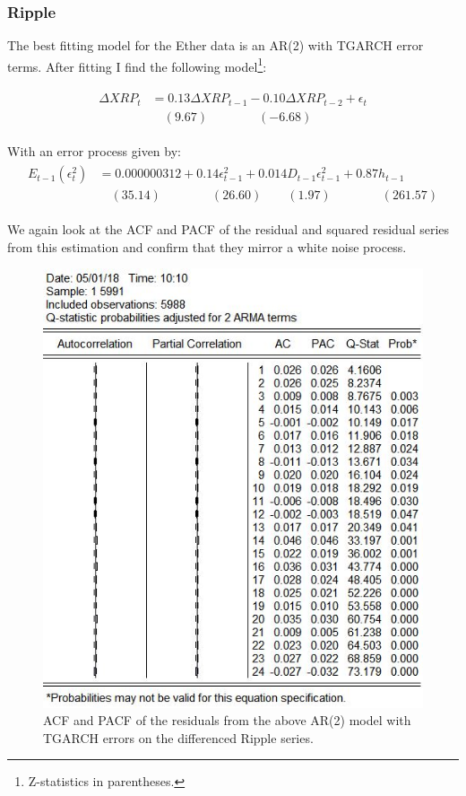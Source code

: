 \documentclass{article}
\begin{document}
	\subsubsection{Ripple}
	
	The best fitting model for the Ether data is an AR(2) with TGARCH error terms. After fitting I find the following model\footnote{Z-statistics in parentheses.}: 
	
	\begin{align}
	\begin{split}
	\Delta XRP_t &= 0.13 \Delta XRP_{t-1} - 0.10 \Delta XRP_{t-2} + \epsilon_t\\
	& \quad (9.67) \quad \quad \quad \quad (-6.68) 
	\end{split}
	\end{align}
	
	With an error process given by: 
	\begin{align}
	\begin{split}
	E_{t-1}(\epsilon_t^2)  &= 0.000000312 + 0.14 \epsilon^2_{t-1} + 0.014 D_{t-1} \epsilon^2_{t-1} + 0.87 h_{t-1}\\
	& \quad (35.14) \quad \quad \quad \quad (26.60) \quad \quad (1.97) \quad \quad \quad \quad (261.57)
	\end{split}
	\end{align}
	
	We again look at the ACF and PACF of the residual and squared residual series from this estimation and confirm that they mirror a white noise process. 
	
	\begin{figure}[H]
		\centering
		\includegraphics[width = .75\textwidth]{xrpTGARCH_residCor.jpg}
		\caption{ACF and PACF of the residuals from the above AR(2) model with TGARCH errors on the differenced Ripple series.}
	\end{figure}
	
\end{document}
